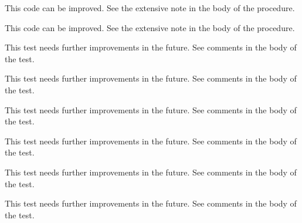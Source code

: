 \begin{DoxyRefList}
 This code can be improved. See the extensive note in the body of the procedure.  
\item[Subprogram \mbox{\hyperlink{namespaceSystem__mod_acdbe0231b40135bc08ab285fc69f2b80}{System\+\_\+mod\+::get\+System\+Info}} (List, Err, OS, count, cache\+File)]\label{todo__todo000077}%
%
 This code can be improved. See the extensive note in the body of the procedure.  
\item[Subprogram \mbox{\hyperlink{namespaceTest__System__mod_a56a58918b2888e7ea0fa691de93cdeb3}{Test\+\_\+\+System\+\_\+mod\+::test\+\_\+\+Cmd\+Arg\+\_\+type\+\_\+1}} ()]\label{todo__todo000085}%
%
 This test needs further improvements in the future. See comments in the body of the test.  
\item[Subprogram \mbox{\hyperlink{namespaceTest__System__mod_a43fd8159ffe52170057e95d4e0c38d63}{Test\+\_\+\+System\+\_\+mod\+::test\+\_\+\+Env\+Var\+\_\+type\+\_\+1}} ()]\label{todo__todo000082}%
%
 This test needs further improvements in the future. See comments in the body of the test.  
\item[Subprogram \mbox{\hyperlink{namespaceTest__System__mod_ab0121f340538dae91c97cc5cdcba0a7b}{Test\+\_\+\+System\+\_\+mod\+::test\+\_\+\+Env\+Var\+\_\+type\+\_\+2}} ()]\label{todo__todo000083}%
%
 This test needs further improvements in the future. See comments in the body of the test.  
\item[Subprogram \mbox{\hyperlink{namespaceTest__System__mod_a26054fb4e3bf2d05710adc7965bc8431}{Test\+\_\+\+System\+\_\+mod\+::test\+\_\+\+Env\+Var\+\_\+type\+\_\+3}} ()]\label{todo__todo000084}%
%
 This test needs further improvements in the future. See comments in the body of the test.  
\item[Subprogram \mbox{\hyperlink{namespaceTest__System__mod_a8d37f80583c104a3dfb6b99a897feb26}{Test\+\_\+\+System\+\_\+mod\+::test\+\_\+execute\+Cmd\+\_\+1}} ()]\label{todo__todo000090}%
%
 This test needs further improvements in the future. See comments in the body of the test.  
\item[Subprogram \mbox{\hyperlink{namespaceTest__System__mod_a733db17082cd5058dbc8d19e6f620909}{Test\+\_\+\+System\+\_\+mod\+::test\+\_\+execute\+Cmd\+\_\+2}} ()]\label{todo__todo000091}%
%
 This test needs further improvements in the future. See comments in the body of the test.  
\item[Subprogram \mbox{\hyperlink{namespaceTest__System__mod_a9a276bf5a7b9db66c140bd2202ebc7e9}{Test\+\_\+\+System\+\_\+mod\+::test\+\_\+get\+System\+Info\+\_\+1}} ()]\label{todo__todo000092}%

\end{DoxyRefList}
